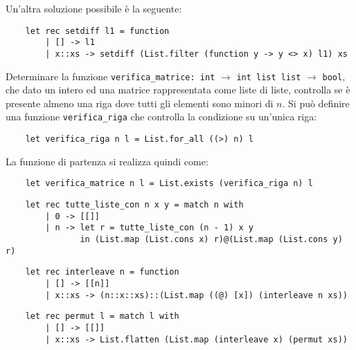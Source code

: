 \documentclass{article}
\numberwithin{equation}{subsection}
\begin{document}
Un'altra soluzione possibile è la seguente:
\begin{verbatim}
    let rec setdiff l1 = function
        | [] -> l1
        | x::xs -> setdiff (List.filter (function y -> y <> x) l1) xs    
\end{verbatim}


Determinare la funzione \verb|verifica_matrice: int| $\rightarrow$ \verb|int list list| $\rightarrow$ \verb|bool|, che dato un intero ed una matrice rappresentata come liste di liste, controlla se è presente almeno una riga dove tutti gli elementi sono minori di $n$. Si può definire una funzione \verb|verifica_riga| che controlla la condizione su un'unica riga:
\begin{verbatim}
    let verifica_riga n l = List.for_all ((>) n) l 
\end{verbatim}
La funzione di partenza si realizza quindi come:
\begin{verbatim}
    let verifica_matrice n l = List.exists (verifica_riga n) l    
\end{verbatim}

\begin{verbatim}
    let rec tutte_liste_con n x y = match n with
        | 0 -> [[]]
        | n -> let r = tutte_liste_con (n - 1) x y
               in (List.map (List.cons x) r)@(List.map (List.cons y) r)
\end{verbatim}

\begin{verbatim}
    let rec interleave n = function
        | [] -> [[n]]
        | x::xs -> (n::x::xs)::(List.map ((@) [x]) (interleave n xs))
\end{verbatim}

\begin{verbatim}
    let rec permut l = match l with
        | [] -> [[]]
        | x::xs -> List.flatten (List.map (interleave x) (permut xs))
\end{verbatim}


\clearpage
\end{document}
